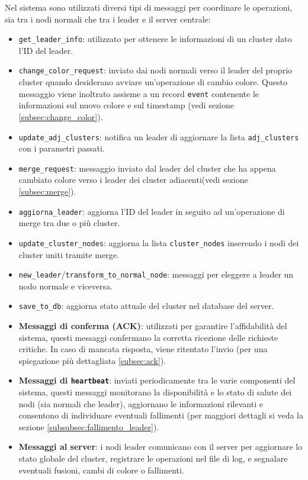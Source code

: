 \documentclass[12pt, a4paper]{report}
\begin{document}
Nel sistema sono utilizzati diversi tipi di messaggi per coordinare le operazioni, sia tra i nodi normali che tra i leader e il server centrale:

\begin{itemize}
    \item \texttt{get\_leader\_info}: utilizzato per ottenere le informazioni di un cluster dato l'ID del leader.
    \item \texttt{change\_color\_request}: inviato dai nodi normali verso il leader del proprio cluster quando desiderano avviare un'operazione di cambio colore. Questo messaggio viene inoltrato assieme a un record \texttt{event} contenente le informazioni sul nuovo colore e sul timestamp (vedi sezione \ref{subsec:change_color}).
    \item \texttt{update\_adj\_clusters}: notifica un leader di aggiornare la lista \texttt{adj\_clusters} con i parametri passati.
    \item \texttt{merge\_request}: messaggio inviato dal leader del cluster che ha appena cambiato colore verso i leader dei cluster adiacenti(vedi sezione \ref{subsec:merge}).
    \item \texttt{aggiorna\_leader}: aggiorna l'ID del leader in seguito ad un'operazione di merge tra due o pi\`u cluster.
    \item \texttt{update\_cluster\_nodes}: aggiorna la lista \texttt{cluster\_nodes} inserendo i nodi dei cluster uniti tramite merge.
    \item \texttt{new\_leader}/\texttt{transform\_to\_normal\_node}: messaggi per eleggere a leader un nodo normale e viceversa.
    \item \texttt{save\_to\_db}: aggiorna stato attuale del cluster nel database del server.
    \item \textbf{Messaggi di conferma (ACK)}: utilizzati per garantire l'affidabilit\`a del sistema, questi messaggi confermano la corretta ricezione delle richieste critiche. In caso di mancata risposta, viene ritentato l'invio (per una spiegazione pi\`u dettagliata \ref{subsec:ack}).
    \item \textbf{Messaggi di \texttt{heartbeat}}: inviati periodicamente tra le varie componenti del sistema, questi messaggi monitorano la disponibilità e lo stato di salute dei nodi (sia normali che leader), aggiornano le informazioni rilevanti e consentono di individuare eventuali fallimenti (per maggiori dettagli si veda la sezione \ref{subsubsec:fallimento_leader}).
    \item \textbf{Messaggi al server}: i nodi leader comunicano con il server per aggiornare lo stato globale del cluster, registrare le operazioni nel file di log, e segnalare eventuali fusioni, cambi di colore o fallimenti.
\end{itemize}
\end{document}
